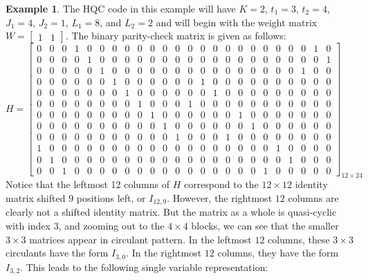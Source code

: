 \documentclass[11pt]{amsart}
\theoremstyle{definition}
\newtheorem{example}[theorem]{Example}
\newcommand{\0}{\mathbf{0}}
\begin{document}
\begin{example} \label{ex:hqc1}
    The HQC code in this example will have $K=2$, $t_1=3$, $t_2=4$, $J_1 = 4$, $J_2 = 1$, $L_1 = 8$, and $L_2=2$ and will begin with the weight matrix $W=\begin{bmatrix}1 & 1 \end{bmatrix}$. The binary parity-check matrix is given as follows:
        \begin{equation}
    H = \left[
        \begin{array}{ccc|ccc|ccc|ccc||ccc|ccc|ccc|ccc}
            0 & 0 & 0 & 1 & 0 & 0 & 0 & 0 & 0 & 0 & 0 & 0 & 0 & 0 & 0 & 0 & 0 & 0 & 0 & 0 & 0 & 0 & 1 & 0 \\
            0 & 0 & 0 & 0 & 1 & 0 & 0 & 0 & 0 & 0 & 0 & 0 & 0 & 0 & 0 & 0 & 0 & 0 & 0 & 0 & 0 & 0 & 0 & 1 \\
            0 & 0 & 0 & 0 & 0 & 1 & 0 & 0 & 0 & 0 & 0 & 0 & 0 & 0 & 0 & 0 & 0 & 0 & 0 & 0 & 0 & 1 & 0 & 0 \\ \hline
            0 & 0 & 0 & 0 & 0 & 0 & 1 & 0 & 0 & 0 & 0 & 0 & 0 & 1 & 0 & 0 & 0 & 0 & 0 & 0 & 0 & 0 & 0 & 0 \\
            0 & 0 & 0 & 0 & 0 & 0 & 0 & 1 & 0 & 0 & 0 & 0 & 0 & 0 & 1 & 0 & 0 & 0 & 0 & 0 & 0 & 0 & 0 & 0 \\
            0 & 0 & 0 & 0 & 0 & 0 & 0 & 0 & 1 & 0 & 0 & 0 & 1 & 0 & 0 & 0 & 0 & 0 & 0 & 0 & 0 & 0 & 0 & 0 \\ \hline
            0 & 0 & 0 & 0 & 0 & 0 & 0 & 0 & 0 & 1 & 0 & 0 & 0 & 0 & 0 & 0 & 1 & 0 & 0 & 0 & 0 & 0 & 0 & 0 \\
            0 & 0 & 0 & 0 & 0 & 0 & 0 & 0 & 0 & 0 & 1 & 0 & 0 & 0 & 0 & 0 & 0 & 1 & 0 & 0 & 0 & 0 & 0 & 0 \\
            0 & 0 & 0 & 0 & 0 & 0 & 0 & 0 & 0 & 0 & 0 & 1 & 0 & 0 & 0 & 1 & 0 & 0 & 0 & 0 & 0 & 0 & 0 & 0 \\ \hline
            1 & 0 & 0 & 0 & 0 & 0 & 0 & 0 & 0 & 0 & 0 & 0 & 0 & 0 & 0 & 0 & 0 & 0 & 0 & 1 & 0 & 0 & 0 & 0 \\
            0 & 1 & 0 & 0 & 0 & 0 & 0 & 0 & 0 & 0 & 0 & 0 & 0 & 0 & 0 & 0 & 0 & 0 & 0 & 0 & 1 & 0 & 0 & 0 \\
            0 & 0 & 1 & 0 & 0 & 0 & 0 & 0 & 0 & 0 & 0 & 0 & 0 & 0 & 0 & 0 & 0 & 0 & 1 & 0 & 0 & 0 & 0 & 0
            \end{array} \right]_{12 \times 24}
    \end{equation}
    Notice that the leftmost 12 columns of $H$ correspond to the $12 \times 12$ identity matrix shifted $9$ positions left, or $I_{12,9}$. However, the rightmost $12$ columns are clearly not a shifted identity matrix. But the matrix as a whole is quasi-cyclic with index $3$, and zooming out to the $4 \times 4$ blocks, we can see that the smaller $3 \times3$ matrices appear in circulant pattern. In the leftmost $12$ columns, these $3 \times 3$ circulants have the form $I_{3,0}$. In the rightmost $12$ columns, they have the form $I_{3,2}$. This leads to the following single variable representation:

\end{example}
\end{document}

